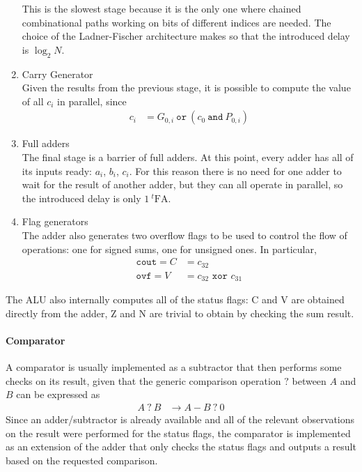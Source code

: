 \begin{enumerate}
    This is the slowest stage because it is the only one where chained combinational paths working on bits of different
    indices are needed. The choice of the Ladner-Fischer architecture makes so that the introduced delay is
    $\log_2{N}$.
    \item Carry Generator \\
    Given the results from the previous stage, it is possible to compute the value of all $c_i$ in parallel, since
    \begin{align*}
        c_i &= G_{0, i}\ \texttt{or}\ (c_0\ \texttt{and}\ P_{0, i})
    \end{align*}

    \item Full adders \\
    The final stage is a barrier of full adders. At this point, every adder has all of its inputs ready: $a_i$, $b_i$,
    $c_i$. For this reason there is no need for one adder to wait for the result of another adder, but they can all
    operate in parallel, so the introduced delay is only $1\ ^t\text{FA}$.

    \item Flag generators \\
    The adder also generates two overflow flags to be used to control the flow of operations: one for signed sums, one
    for unsigned ones. In particular,
    \begin{align*}
        \texttt{cout} = C &= c_{32} \\
        \texttt{ovf} = V &= c_{32} \texttt{ xor } c_{31}
    \end{align*}
\end{enumerate}
The ALU also internally computes all of the status flags: C and V are obtained directly from the adder, Z and N are
trivial to obtain by checking the sum result.

\paragraph{Comparator}
A comparator is usually implemented as a subtractor that then performs some checks on its result, given that the generic
comparison operation $?$ between $A$ and $B$ can be expressed as
\begin{align}
    A\ ?\ B &\rightarrow A - B\ ?\ 0
\end{align}
Since an adder/subtractor is already available and all of the relevant observations on the result were performed for
the status flags, the comparator is implemented as an extension of the adder that only checks the status flags and
outputs a result based on the requested comparison.

